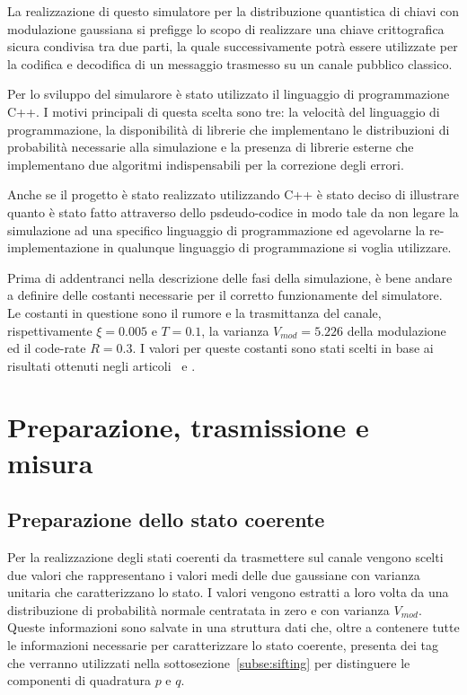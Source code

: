 La realizzazione di questo simulatore per la distribuzione quantistica di chiavi con modulazione gaussiana si prefigge lo scopo di realizzare una chiave crittografica sicura condivisa tra due parti, la quale successivamente potr\`a essere utilizzate per la codifica e decodifica di un messaggio trasmesso su un canale pubblico classico. 

Per lo sviluppo del simularore \`e stato utilizzato il linguaggio di programmazione C++. I motivi principali di questa scelta sono tre: la velocit\`a del linguaggio di programmazione, la disponibilit\`a di librerie che implementano le distribuzioni di probabilit\`a necessarie alla simulazione e la presenza di librerie esterne che implementano due algoritmi indispensabili per la correzione degli errori.

Anche se il progetto \`e stato realizzato utilizzando C++ \`e stato deciso di illustrare quanto \`e stato fatto attraverso dello psdeudo-codice in modo tale da non legare la simulazione ad una specifico linguaggio di programmazione ed agevolarne la re-implementazione in qualunque linguaggio di programmazione si voglia utilizzare.

Prima di addentranci nella descrizione delle fasi della simulazione, \`e bene andare a definire delle costanti necessarie per il corretto funzionamente del simulatore. Le costanti in questione sono il rumore e la trasmittanza del canale, rispettivamente $\xi = 0.005$ e $T=0.1$, la varianza $V_{mod}=5.226$ della modulazione ed il code-rate $R = 0.3$. I valori per queste costanti sono stati scelti in base ai risultati ottenuti negli articoli~\cite{https://doi.org/10.1002/qute.201800011} e \cite{e24101463}.

\section{Preparazione, trasmissione e misura}

\subsection{Preparazione dello stato coerente}\label{subse:prep-stato}
Per la realizzazione degli stati coerenti da trasmettere sul canale vengono scelti due valori che rappresentano i valori medi delle due gaussiane con varianza unitaria che caratterizzano lo stato. I valori vengono estratti a loro volta da una distribuzione di probabilit\`a normale centratata in zero e con varianza $V_{mod}$. Queste informazioni sono salvate in una struttura dati che, oltre a contenere tutte le informazioni necessarie per caratterizzare lo stato coerente, presenta dei tag che verranno utilizzati nella sottosezione~\ref{subse:sifting} per distinguere le componenti di quadratura $p$ e $q$.

